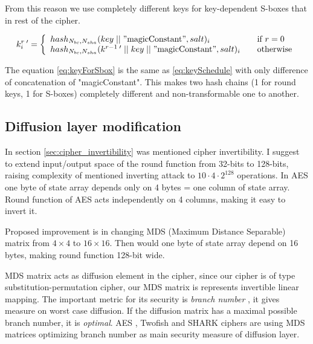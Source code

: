 \documentclass[11pt,oneside,final]{fithesis2}
\begin{document}
    From this reason we use completely different keys for key-dependent S-boxes that in rest of the cipher.

    \begin{equation}\label{eq:keyForSbox}
    k_i^{r \; \prime} = \left\{ 
    \begin{array}{l l} 
	hash_{N_{bc}, N_{sha}}(key\; || \; "\text{magicConstant}", salt)_i                              & \quad \text{if $r=0$}\\
	hash_{N_{bc}, N_{sha}}(k^{r-1 \; \prime} \; || \; key \; || \; "\text{magicConstant}", salt)_i            & \quad \text{otherwise}
    \end{array} \right.
    \end{equation}
    
    The equation \ref{eq:keyForSbox} is the same as \ref{eq:keySchedule} with only difference of concatenation of "magicConstant". This makes 
    two hash chains (1 for round keys, 1 for S-boxes) completely different and non-transformable one to another.
   
    \subsection{Diffusion layer modification}\label{sec:cipher_invert_improvement}
    In section \ref{sec:cipher_invertibility} was mentioned cipher invertibility. I suggest to extend input/output space of the round function
    from 32-bits to 128-bits, raising complexity of mentioned inverting attack to $10\cdot4\cdot2^{128}$ operations. In AES one byte of state array depends
    only on 4 bytes = one column of state array. Round function of AES acts independently on 4 columns, making it easy to invert it. 

    Proposed improvement is in changing MDS (Maximum Distance Separable) matrix from $4 \times 4$ to $16 \times 16$. 
    Then would one byte of state array depend on 16 bytes, making round function 128-bit wide.

    MDS matrix acts as diffusion element in the cipher, since our cipher is of type substitution-permutation cipher, our MDS matrix 
    is represents invertible linear mapping. The important metric for its security is \emph{branch number} \citep{daemenBranch}, it gives measure on
    worst case diffusion. If the diffusion matrix has a maximal possible branch number, it is \emph{optimal}. 
    AES \citep{2002-daemen}, Twofish \citep{Schneier98twofish:a} and SHARK \citep{shark96} ciphers are using MDS matrices optimizing branch number as 
    main security measure of diffusion layer.
    
\end{document}
